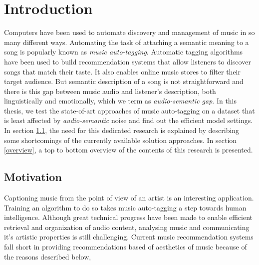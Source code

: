 

\chapter{Introduction} %

\label{Chapter1} %


\newcommand{\keyword}[1]{\textbf{#1}}
\newcommand{\tabhead}[1]{\textbf{#1}}
\newcommand{\code}[1]{\texttt{#1}}
\newcommand{\file}[1]{\texttt{\bfseries#1}}
\newcommand{\option}[1]{\texttt{\itshape#1}}



Computers have been used to automate discovery and management of music in so many different ways. Automating the task of attaching a semantic meaning to a song is popularly known as \textit{music auto-tagging}. Automatic tagging algorithms have been used to build recommendation systems that allow listeners to discover songs that match their taste. It also enables online music stores to filter their target audience. But semantic description of a song is not straightforward and there is this gap between music audio and listener's description, both linguistically and emotionally, which we term as \textit{audio-semantic gap}. In this thesis, we test the state-of-art approaches of music auto-tagging on a dataset that is least affected by \textit{audio-semantic} noise and find out the efficient model settings. In section \ref{motivation}, the need for this dedicated research is explained by describing some shortcomings of the currently available solution approaches. In section \ref{overview}, a top to bottom overview of the contents of this research is presented.   


\section{Motivation}
\label{motivation}
Captioning music from the point of view of an artist is an interesting application. Training an algorithm to do so takes music auto-tagging a step towards human intelligence. Although great technical progress have been made to enable efficient retrieval and organization of audio content, analysing music and communicating it's artistic properties is still challenging. Current music recommendation systems fall short in providing recommendations based of aesthetics of music because of the reasons described below,
  
